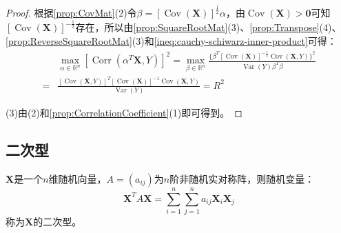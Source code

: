 \begin{proof}
	根据\cref{prop:CovMat}(2)令$\beta=[\operatorname{Cov}(\mathbf{X})]^{\frac{1}{2}}\alpha$，由$\operatorname{Cov}(\mathbf{X})>\mathbf{0}$可知$[\operatorname{Cov}(\mathbf{X})]^{-\frac{1}{2}}$存在，所以由\cref{prop:SquareRootMat}(3)、\cref{prop:Transpose}(4)、\cref{prop:ReverseSquareRootMat}(3)和\cref{ineq:cauchy-schiwarz-inner-product}可得：
	\begin{align*}
		&\max_{\alpha\in\mathbb{R}^{n}}[\operatorname{Corr}(\alpha ^T\mathbf{X},Y)]^2=\max_{\beta\in\mathbb{R}^{n}}\frac{\{\beta^T[\operatorname{Cov}(\mathbf{X})]^{-\frac{1}{2}}\operatorname{Cov}(\mathbf{X},Y)\}^2}{\operatorname{Var}(Y)\beta^T\beta} \\
		=&\frac{[\operatorname{Cov}(\mathbf{X},Y)]^T[\operatorname{Cov}(\mathbf{X})]^{-1}\operatorname{Cov}(\mathbf{X},Y)}{\operatorname{Var}(Y)}=R^2
	\end{align*}\par
	(3)由(2)和\cref{prop:CorrelationCoefficient}(1)即可得到。
\end{proof}

\subsection{二次型}
\begin{definition}
	$\mathbf{X}$是一个$n$维随机向量，$A=(a_{ij})$为$n$阶非随机实对称阵，则随机变量：
	\begin{equation*}
		\mathbf{X}^TA\mathbf{X}=\sum_{i=1}^{n}\sum_{j=1}^{n}a_{ij}\mathbf{X}_i\mathbf{X}_j
	\end{equation*}
	称为$\mathbf{X}$的二次型。
\end{definition}

